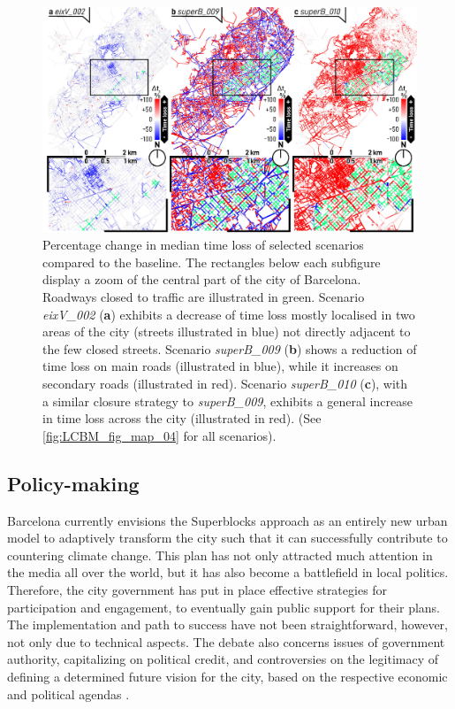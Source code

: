 \begin{figure}[htbp!]
    \centering
    \includegraphics[width=1\textwidth]{LCBM_fig11.jpg}
    \caption{Percentage change in median time loss of selected scenarios compared to the baseline. The rectangles below each subfigure display a zoom of the central part of the city of Barcelona. Roadways closed to traffic are illustrated in green. Scenario \emph{eixV\_002} (\textbf{a}) exhibits a decrease of time loss mostly localised in two areas of the city (streets illustrated in blue) not directly adjacent to the few closed streets. Scenario \emph{superB\_009} (\textbf{b}) shows a reduction of time loss on main roads (illustrated in blue), while it increases on secondary roads (illustrated in red). Scenario \emph{superB\_010} (\textbf{c}), with a similar closure strategy to \emph{superB\_009}, exhibits a general increase in time loss across the city (illustrated in red). (See \cref{fig:LCBM_fig_map_04} for all scenarios).}
   \label{fig:LCBM_fig11}
\end{figure}

\subsection{Policy-making}
\label{subsec:LCBM_4.4_policy}

Barcelona currently envisions the Superblocks approach as an entirely new urban model \citep{AjuntamentdeBarcelona2021c} to adaptively transform the city \citep{Field2014} such that it can successfully contribute to countering climate change. This plan has not only attracted much attention in the media all over the world, but it has also become a battlefield in local politics. Therefore, the city government has put in place effective strategies for participation and engagement, to eventually gain public support for their plans. The implementation and path to success have not been straightforward, however, not only due to technical aspects. The debate also concerns issues of government authority, capitalizing on political credit, and controversies on the legitimacy of defining a determined future vision for the city, based on the respective economic and political agendas \citep{Zografos2020}.

